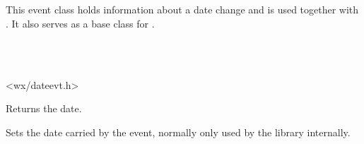 
\section{}\label{wxdateevent}

This event class holds information about a date change and is used together
with . It also serves as a base class
for .


\\
\\


<wx/dateevt.h>




\label{wxdateeventgetdate}


Returns the date.


\label{wxdateeventsetdate}


Sets the date carried by the event, normally only used by the library
internally.

